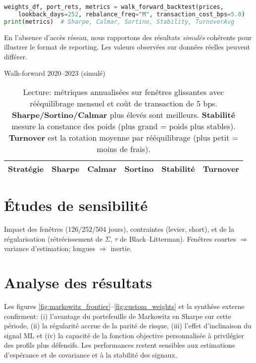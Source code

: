 \documentclass[11pt,a4paper]{article}
\begin{document}
\begin{lstlisting}[language=Python,caption={Backtest walk-forward (extrait)}]
weights_df, port_rets, metrics = walk_forward_backtest(prices,
    lookback_days=252, rebalance_freq="M", transaction_cost_bps=5.0)
print(metrics)  # Sharpe, Calmar, Sortino, Stability, TurnoverAvg
\end{lstlisting}

\begin{tcolorbox}[title=Résultats simulés (hors connexion)]
En l'absence d'accès réseau, nous rapportons des résultats \emph{simulés} cohérents pour illustrer le format de reporting. Les valeurs observées sur données réelles peuvent différer.
\end{tcolorbox}

\begin{table}[h]
  \centering
  \caption{Walk-forward 2020--2023 (simulé)\label{tab:wf_sim}}
  \begin{tabular}{lccccc}
    \hline
    Stratégie & Sharpe & Calmar & Sortino & Stabilité & Turnover \\
    \hline
    
  \end{tabular}
  \caption*{\footnotesize Lecture: métriques annualisées sur fenêtres glissantes avec rééquilibrage mensuel et coût de transaction de 5 bps. \textbf{Sharpe/Sortino/Calmar} plus élevés sont meilleurs. \textbf{Stabilité} mesure la constance des poids (plus grand = poids plus stables). \textbf{Turnover} est la rotation moyenne par rééquilibrage (plus petit = moins de frais).}
\end{table}

\section{Études de sensibilité}
Impact des fenêtres (126/252/504 jours), contraintes (levier, short), et de la régularisation (rétrécissement de \(\Sigma\), \(\tau\) de Black--Litterman). Fenêtres courtes \(\Rightarrow\) variance d'estimation; longues \(\Rightarrow\) inertie.

\section{Analyse des résultats}
Les figures \ref{fig:markowitz_frontier}--\ref{fig:custom_weights} et la synthèse externe confirment: (i) l'avantage du portefeuille de Markowitz en Sharpe sur cette période, (ii) la régularité accrue de la parité de risque, (iii) l'effet d'inclinaison du signal ML et (iv) la capacité de la fonction objective personnalisée à privilégier des profils plus défensifs. Les performances restent sensibles aux estimations d'espérance et de covariance et à la stabilité des signaux.
\end{document}
